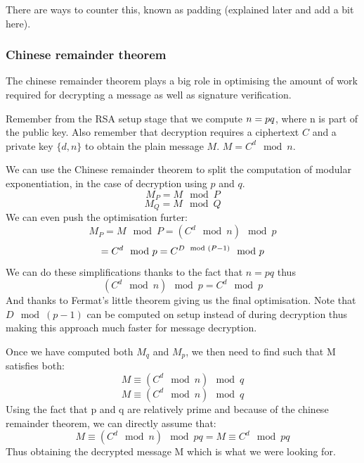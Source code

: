 \documentclass[conference]{IEEEtran}
\begin{document}
There are ways to counter this, known as padding (explained later and add a bit here).

\subsubsection*{Chinese remainder theorem}
The chinese remainder theorem plays a big role in optimising 
the amount of work required for decrypting a message as well as 
signature verification.


Remember from the RSA setup stage that we compute 
$n = p\*q$, where n is part of the public key.
Also remember that decryption requires a ciphertext $C$ and
a private key $\{d,n\}$ to obtain the plain message $M$.
$M = C^{d}\mod n$.

We can use the Chinese remainder theorem to split the computation of
modular exponentiation, in the case of decryption using $p$ and $q$.
\begin{equation*}
    M_{P} = M\mod P
\end{equation*}
\begin{equation*}
    M_{Q} = M\mod Q
\end{equation*}
We can even push the optimisation furter:
\begin{equation*}
    M_{P} = M\mod P = (C^{d}\mod n)\mod p
\end{equation*}
\begin{equation*}
    = C^{d}\mod p\\ = C^{D\mod(P-1)}\mod p
\end{equation*}
We can do these simplifications thanks to the fact that $n = pq$ thus 
\begin{equation*}
    (C^{d}\mod n)\mod p = C^{d}\mod p
\end{equation*}
And thanks to Fermat's little theorem giving us the final optimisation.
Note that $D\mod(p - 1)$ can be computed on setup instead of during decryption
thus making this approach much faster for message decryption.

Once we have computed both $M_{q}$ and $M_{p}$, we then need to find such 
that M satisfies both:
\begin{equation*}
    M \equiv (C^{d}\mod n)\mod q
\end{equation*}
\begin{equation*}
    M \equiv (C^{d}\mod n)\mod q
\end{equation*}
Using the fact that p and q are relatively prime and because of the 
chinese remainder theorem, we can directly assume that:
\begin{equation*}
    M \equiv (C^{d}\mod n)\mod pq = M \equiv C^{d}\mod pq
\end{equation*}
Thus obtaining the decrypted message M which is what we were looking for.
\end{document}
